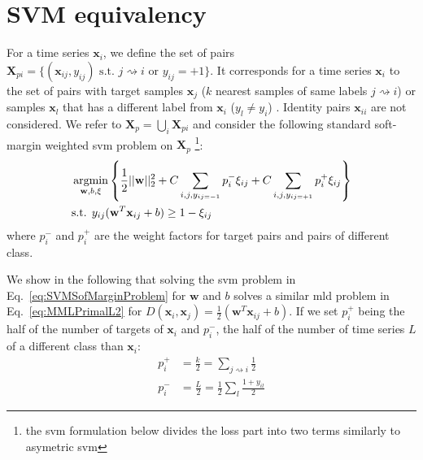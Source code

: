 \chapter{SVM equivalency}
\label{chap:app:svm_link}

For a time series $\textbf{x}_i$, we define the set of pairs $\textbf{X}_{pi}=\{(\textbf{x}_{ij},y_{ij}) \text{ s.t. } j\rightsquigarrow i \text{ or } y_{ij}=+1\}$. It corresponds for a time series $\textbf{x}_i$ to the set of pairs with target samples $\textbf{x}_j$ ($k$ nearest samples of same labels $j\rightsquigarrow i$) or samples $\textbf{x}_l$ that has a different label from $\textbf{x}_i$ ($y_l \neq y_i$) . Identity pairs $\textbf{x}_{ii}$ are not considered. We refer to $\textbf{X}_{p}=\bigcup\limits_{i} \textbf{X}_{pi}$ and consider the following standard soft-margin weighted {\sc svm} problem on $\textbf{X}_p$ \footnote{the {\sc svm} formulation below divides the loss part into two terms similarly to asymetric {\sc svm}}: 
\begin{equation}
\begin{aligned}
&\displaystyle \argmin_{\textbf{w},b,\xi} 
\left\lbrace \frac{1}{2}||\textbf{w}||_2^2
+ C \sum\limits_{i,j,y_{ij=-1}}p_i^-\xi_{ij}
+ C \sum\limits_{i,j, y_{ij=+1}}p_i^+\xi_{ij} \right\rbrace \\
& \text{s.t.  }  y_{ij}(\textbf{w}^T\textbf{x}_{ij}+b) \geq 1-\xi_{ij}
\end{aligned}
\label{eq:SVMSofMarginProblem}
\end{equation}
\noindent where $p_i^-$ and $p_i^+$ are the weight factors for target pairs and pairs of different class.

\noindent  We show in the following that solving the {\sc svm} problem in Eq.~\ref{eq:SVMSofMarginProblem} for $\textbf{w}$ and $b$ solves a similar {\sc mld} problem in Eq.~\ref{eq:MMLPrimalL2} for $D(\textbf{x}_i,\textbf{x}_j)=\frac{1}{2}(\textbf{w}^T\textbf{x}_{ij}+b)$. If we set $p_i^+$ being the half of the number of targets of $\textbf{x}_i$ and $p_i^-$, the half of the number of time series $L$ of a different class than $\textbf{x}_i$:
\begin{align}
	p_i^+ &= \frac{k}{2} = \sum_{j \rightsquigarrow i} \frac{1}{2} \label{eq:pi_plus}\\
	p_i^- &= \frac{L}{2} = \frac{1}{2}\sum_l \frac{1+y_{il}}{2} \label{eq:pi_moins}
\end{align}

